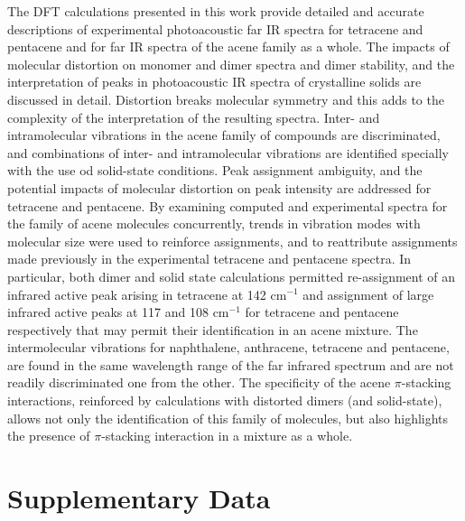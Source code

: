  The DFT calculations presented in this work provide detailed and accurate descriptions of experimental photoacoustic far IR spectra for tetracene and pentacene and for far IR spectra of the acene family as a whole.  The impacts of molecular distortion on monomer and dimer spectra and dimer stability, and the interpretation of peaks in photoacoustic IR spectra of crystalline solids are discussed in detail. Distortion breaks molecular symmetry and this adds to the complexity of the interpretation of the resulting spectra. Inter- and intramolecular vibrations in the acene family of compounds are discriminated, and combinations of inter- and intramolecular vibrations are identified specially with the use od solid-state conditions. Peak assignment ambiguity, and the potential impacts of molecular distortion on peak intensity are addressed for tetracene and pentacene. By examining computed and experimental spectra for the family of acene molecules concurrently, trends in vibration modes with molecular size were used to reinforce assignments, and to reattribute assignments made previously in the experimental tetracene and pentacene spectra. In particular, both dimer and solid state calculations permitted re-assignment of an infrared active peak arising in tetracene at 142 cm$^{-1}$ and assignment of large infrared active peaks at 117 and 108 cm$^{-1}$ for tetracene and pentacene respectively that may permit their identification in an acene mixture. The intermolecular vibrations for naphthalene, anthracene, tetracene and pentacene, are found in the same wavelength range of the far infrared spectrum and are not readily discriminated one from the other. The specificity of the acene $\pi$-stacking interactions, reinforced by calculations with distorted dimers (and solid-state), allows not only the identification of this family of molecules, but also highlights the presence of $\pi$-stacking interaction in a mixture as a whole.
 
 \newpage
 
 \section*{Supplementary Data}
 
